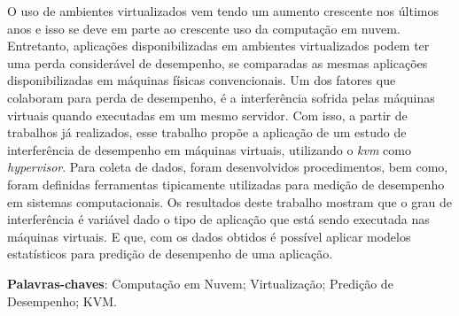 \begin{resumo}
 O uso de ambientes virtualizados vem tendo um aumento crescente nos últimos anos e isso se deve em parte ao crescente uso da computação em nuvem. Entretanto, aplicações disponibilizadas em ambientes virtualizados podem ter uma perda considerável de desempenho, se comparadas as mesmas aplicações disponibilizadas em máquinas físicas convencionais. Um dos fatores que colaboram para perda de desempenho, é a interferência sofrida pelas máquinas virtuais quando executadas em um mesmo servidor. Com isso, a partir de trabalhos já realizados, esse trabalho propõe a aplicação de um estudo de interferência de desempenho em máquinas virtuais, utilizando o \textit{kvm} como \textit{hypervisor}. Para coleta de dados, foram desenvolvidos procedimentos, bem como, foram definidas ferramentas tipicamente utilizadas para medição de desempenho em sistemas computacionais.
Os resultados deste trabalho mostram que o grau de interferência é variável dado o tipo de aplicação que está sendo executada nas máquinas virtuais. E que, com os dados obtidos é possível aplicar modelos estatísticos para predição de desempenho de uma aplicação.  %




 \vspace{\onelineskip}
    
 \noindent
 \textbf{Palavras-chaves}: Computação em Nuvem; Virtualização; Predição de Desempenho; KVM.
\end{resumo}
